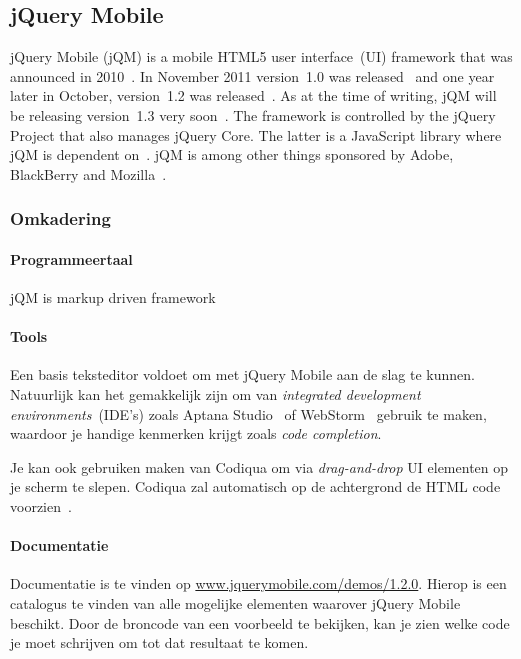 \documentclass[a4paper]{article}
\newcommand{\term}[1]{\emph{#1}}
\newcommand{\code}[1]{\texttt{#1}}
\renewcommand{\url}[1]{\href{http://#1}{#1}}
\begin{document}
\subsection{jQuery Mobile} %
\label{sec:jqm}

jQuery Mobile (jQM) is a mobile HTML5 user interface~(UI) framework that was announced in 2010~\cite{Resig2010}. 
In November 2011 version~1.0 was released~\cite{Parker2011} and one year later in October, version~1.2 was released~\cite{Parker2012}. 
As at the time of writing, jQM will be releasing version~1.3 very soon~\cite{Parker2013}.
The framework is controlled by the jQuery Project that also manages jQuery Core. 
The latter is a JavaScript library where jQM is dependent on~\cite{JQuery2012}. 
jQM is among other things sponsored by Adobe, BlackBerry and Mozilla~\cite{JQuery2012a}.

\subsubsection{Omkadering}
\paragraph{Programmeertaal}
jQM is markup driven framework

\paragraph{Tools}
Een basis teksteditor voldoet om met jQuery Mobile aan de slag te kunnen. Natuurlijk kan het gemakkelijk zijn om van \term{integrated development environments}~(IDE's) zoals Aptana Studio~\cite{Aptana2012} of WebStorm~\cite{JetBrains2012} gebruik te maken, waardoor je handige kenmerken krijgt zoals \term{code completion}.

Je kan ook gebruiken maken van Codiqua om via \term{drag-and-drop} UI elementen op je scherm te slepen. Codiqua zal automatisch op de achtergrond de HTML code voorzien~\cite{Sperry2012}.

\paragraph{Documentatie}
Documentatie is te vinden op \url{www.jquerymobile.com/demos/1.2.0}. Hierop is een catalogus te vinden van alle mogelijke elementen waarover jQuery Mobile beschikt. Door de broncode van een voorbeeld te bekijken, kan je zien welke code je moet schrijven om tot dat resultaat te komen.
\end{document}
